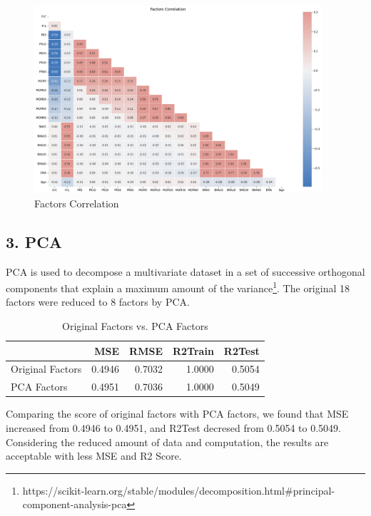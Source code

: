 \documentclass[UTF8]{ctexart}
\begin{document}
\begin{figure}[htbp]
	\centerline{\includegraphics[width=0.95\textwidth]{factors_corr.png}}
	\caption{Factors Correlation}
\end{figure}

\subsection*{3. PCA}

PCA is used to decompose a multivariate dataset in a set of successive orthogonal components that explain a maximum amount of the variance\footnote{https://scikit-learn.org/stable/modules/decomposition.html\#principal-component-analysis-pca}. The original 18 factors were reduced to 8 factors by PCA.

\begin{table}[htbp]
	\centering
	\begin{tabular}{lrrrr}
		\toprule
		                 & MSE    & RMSE   & R2Train & R2Test \\
		\midrule
		Original Factors & 0.4946 & 0.7032 & 1.0000  & 0.5054 \\
		PCA Factors      & 0.4951 & 0.7036 & 1.0000  & 0.5049 \\
		\bottomrule
	\end{tabular}
	\setlength{\abovecaptionskip}{0.3cm}
	\setlength{\belowcaptionskip}{0cm}

	\caption{Original Factors vs. PCA Factors}
\end{table}

Comparing the score of original factors with PCA factors, we found that MSE increased from 0.4946 to 0.4951, and R2Test decresed from 0.5054 to 0.5049. Considering the reduced amount of data and computation, the results are acceptable with less MSE and R2 Score.
\end{document}
